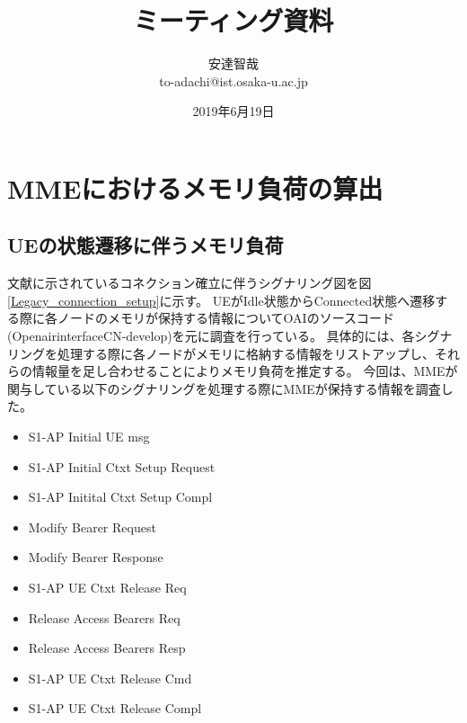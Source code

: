 \documentclass[a4j]{ujarticle}
\title{ミーティング資料}
\author{安達智哉\\to-adachi@ist.osaka-u.ac.jp}
\date{2019年6月19日}
\begin{document}
\maketitle


\section{MMEにおけるメモリ負荷の算出}
\label{seq:mme_memory}
\subsection{UEの状態遷移に伴うメモリ負荷}
文献\cite{3gpp.23.720}に示されているコネクション確立に伴うシグナリング図を図\ref{Legacy_connection_setup}に示す。
UEがIdle状態からConnected状態へ遷移する際に各ノードのメモリが保持する情報についてOAIのソースコード(OpenairinterfaceCN-develop)を元に調査を行っている。
具体的には、各シグナリングを処理する際に各ノードがメモリに格納する情報をリストアップし、それらの情報量を足し合わせることによりメモリ負荷を推定する。
今回は、MMEが関与している以下のシグナリングを処理する際にMMEが保持する情報を調査した。
\begin{itemize}
  \item S1-AP Initial UE msg
  \item S1-AP Initial Ctxt Setup Request
  \item S1-AP Initital Ctxt Setup Compl
  \item Modify Bearer Request
  \item Modify Bearer Response
  \item S1-AP UE Ctxt Release Req
  \item Release Access Bearers Req
  \item Release Access Bearers Resp
  \item S1-AP UE Ctxt Release Cmd
  \item S1-AP UE Ctxt Release Compl
\end{itemize}
\end{document}
